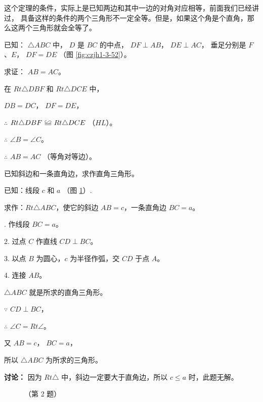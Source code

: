 这个定理的条件，实际上是已知两边和其中一边的对角对应相等，前面我们已经讲过，
具备这样的条件的两个三角形不一定全等。但是，如果这个角是个直角，那么这两个三角形就会全等了。

\liti 已知： $\triangle ABC$ 中， $D$ 是 $BC$ 的中点， $DF \perp AB$，
$DE \perp AC$， 垂足分别是 $F$、$E$， $DF = DE$ （图 \ref{fig:czjh1-3-52}）。

求证： $AB = AC$。

\zhengming 在 $Rt \triangle DBF$ 和 $Rt \triangle DCE$ 中，

\qquad $DB = DC$， $DF = DE$，

$\therefore$ \quad $Rt \triangle DBF \quandeng Rt \triangle DCE$ （$HL$）。

$\therefore$ \quad $\angle B = \angle C$。

$\therefore$ \quad $AB = AC$ （等角对等边）。



\liti 已知斜边和一条直角边，求作直角三角形。

已知：线段 $c$ 和 $a$ （图 \ref{fig:czjh1-3-53}）.

求作：$Rt \triangle ABC$，使它的斜边 $AB = c$，一条直角边 $BC = a$。

. 作线段 $BC = a$。

2. 过点 $C$ 作直线  $CD \perp BC$。

3. 以点 $B$ 为圆心，$c$ 为半径作弧，交 $CD$ 于点 $A$。

4. 连接 $AB$。

$\triangle ABC$ 就是所求的直角三角形。

\zhengming $\because$ \quad $CD \perp BC$，

$\therefore$ \quad $\angle C = Rt \angle$。

又 $AB = c$， $BC = a$，

所以 $\triangle ABC$ 为所求的三角形。

\textbf{讨论：} 因为 $Rt \triangle$ 中，斜边一定要大于直角边，所以  $c \leqslant a$ 时，此题无解。

\begin{figure}[htbp]
    \centering
    \begin{minipage}[b]{7cm}
        \centering
        
        \caption{}\label{fig:czjh1-3-53}
    \end{minipage}
    \qquad
    \begin{minipage}[b]{7cm}
        \centering
        
        \caption*{（第 2 题）}
    \end{minipage}
\end{figure}


\begin{lianxi}

\xiaoti{}%
\begin{xiaoxiaotis}%


\end{xiaoxiaotis}




\end{lianxi}


